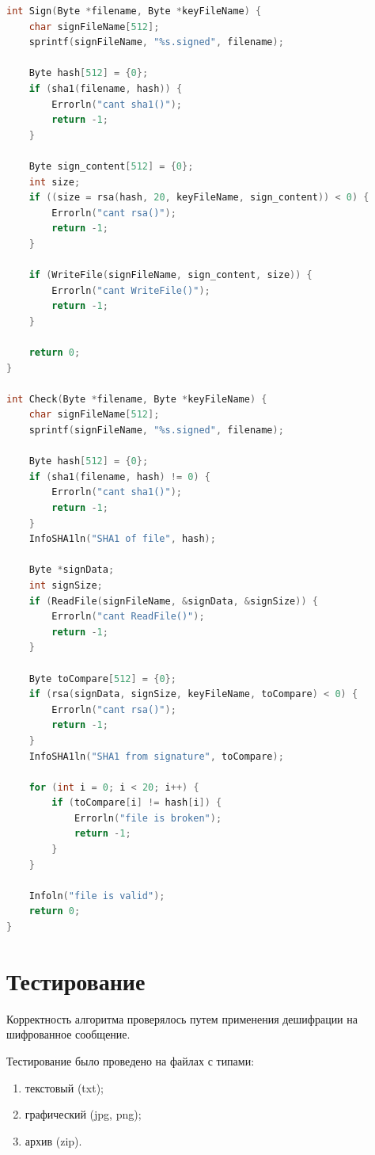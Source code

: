 \begin{lstlisting}[language=C, label=lst:rsa, caption={Реализация алгоритма цифровой подписи на основе SHA1 и RSA}]
int Sign(Byte *filename, Byte *keyFileName) {
    char signFileName[512];
    sprintf(signFileName, "%s.signed", filename);

    Byte hash[512] = {0};
    if (sha1(filename, hash)) {
        Errorln("cant sha1()");
        return -1;
    }

    Byte sign_content[512] = {0};
    int size;
    if ((size = rsa(hash, 20, keyFileName, sign_content)) < 0) {
        Errorln("cant rsa()");
        return -1;
    }

    if (WriteFile(signFileName, sign_content, size)) {
        Errorln("cant WriteFile()");
        return -1;
    }

    return 0;
}

int Check(Byte *filename, Byte *keyFileName) {
    char signFileName[512];
    sprintf(signFileName, "%s.signed", filename);

    Byte hash[512] = {0};
    if (sha1(filename, hash) != 0) {
        Errorln("cant sha1()");
        return -1;
    }
    InfoSHA1ln("SHA1 of file", hash);

    Byte *signData;
    int signSize;
    if (ReadFile(signFileName, &signData, &signSize)) {
        Errorln("cant ReadFile()");
        return -1;
    }

    Byte toCompare[512] = {0};
    if (rsa(signData, signSize, keyFileName, toCompare) < 0) {
        Errorln("cant rsa()");
        return -1;
    }
    InfoSHA1ln("SHA1 from signature", toCompare);

    for (int i = 0; i < 20; i++) {
        if (toCompare[i] != hash[i]) {
            Errorln("file is broken");
            return -1;
        }
    }

    Infoln("file is valid");
    return 0;
}
\end{lstlisting}


\section{Тестирование}

Корректность алгоритма проверялось путем применения дешифрации на шифрованное сообщение.

Тестирование было проведено на файлах с типами:

\begin{enumerate}[label=\arabic*)]
	\item текстовый (txt);
	\item графический (jpg, png);
	\item архив (zip).
\end{enumerate}



